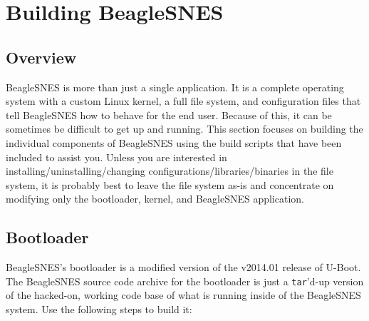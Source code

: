 \chapter{Building BeagleSNES}

\section{Overview}

BeagleSNES is more than just a single application.  It is a complete operating system with a custom Linux kernel, a full file system, and configuration files that tell BeagleSNES how to behave for the end user.  Because of this, it can be sometimes be difficult to get up and running.  This section focuses on building the individual components of BeagleSNES using the build scripts that have been included to assist you.  Unless you are interested in installing/uninstalling/changing configurations/libraries/binaries in the file system, it is probably best to leave the file system as-is and concentrate on modifying only the bootloader, kernel, and BeagleSNES application.

\section{Bootloader}

BeagleSNES's bootloader is a modified version of the v2014.01 release of U-Boot.  The BeagleSNES source code archive for the bootloader is just a \texttt{tar}'d-up version of the hacked-on, working code base of what is running inside of the BeagleSNES system.  Use the following steps to build it:

